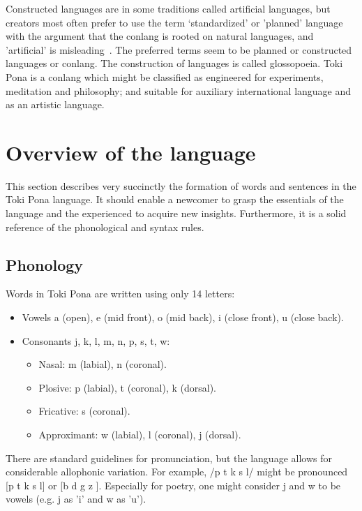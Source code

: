 \documentclass{article}
\begin{document}
Constructed languages are in some traditions called artificial
languages, but creators most often prefer to use the term `standardized'
or 'planned' language with the argument that the conlang
is rooted on natural languages, and 'artificial' is misleading~\cite{conlanWikip}.
The preferred terms seem to be planned or constructed languages
or conlang.
The construction of languages is called glossopoeia.
Toki Pona is a conlang which might be classified
as engineered for experiments, meditation and philosophy;
and suitable for auxiliary international language and
as an artistic language. 



\section{Overview of the language}\label{basics}
This section describes very succinctly the formation of
words and sentences in the Toki Pona language.
It should enable a newcomer to grasp the essentials
of the language and the experienced to
acquire new insights.
Furthermore, it is a solid reference of the phonological and syntax
rules.

\subsection{Phonology}
Words in Toki Pona are written using only 14 letters:
\begin{itemize}
  \item Vowels a (open), e (mid front), o (mid back), i (close front),
    u (close back).
  \item Consonants j, k, l, m, n, p, s, t, w:
    \begin{itemize}
      \item Nasal: m (labial), n (coronal).
      \item Plosive: p (labial), t (coronal), k (dorsal).
      \item Fricative: s (coronal).
      \item Approximant: w (labial), l (coronal), j (dorsal).
    \end{itemize}
\end{itemize}

There are standard guidelines for pronunciation,
but the language allows for considerable allophonic
variation.
For example, /p t k s l/ might be pronounced
[p t k s l] or [b d g z ].
Especially for poetry, one might consider
j and w to be vowels
(e.g. j as 'i' and w as 'u').
\end{document}
